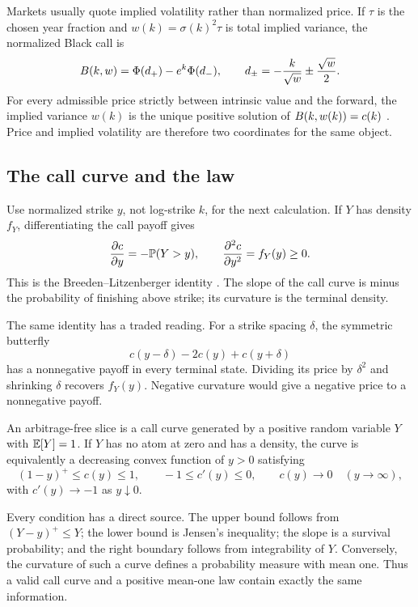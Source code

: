 Markets usually quote implied volatility rather than normalized price.  If
$\tau$ is the chosen year fraction and $w(k)=\sigma(k)^2\tau$ is total implied
variance, the normalized Black call is
\begin{equation}
B(k,w)=\Phi(d_+)-e^k\Phi(d_-),
\qquad d_\pm=-\frac{k}{\sqrt w}\pm\frac{\sqrt w}{2}.
\label{eq:black}
\end{equation}
For every admissible price strictly between intrinsic value and the forward,
the implied variance $w(k)$ is the unique positive solution of
$B(k,w(k))=c(k)$ \citep{Black1976}.  Price and implied volatility are
therefore two coordinates for the same object.

\subsection{The call curve and the law}

Use normalized strike $y$, not log-strike $k$, for the next calculation.  If
$Y$ has density $f_Y$, differentiating the call payoff gives
\begin{equation}
\frac{\partial c}{\partial y}=-\mathbb{P}(Y>y),\qquad
\frac{\partial^2c}{\partial y^2}=f_Y(y)\ge0.
\label{eq:BL}
\end{equation}
This is the Breeden--Litzenberger identity
\citep{BreedenLitzenberger1978}.  The slope of the call curve is minus the
probability of finishing above strike; its curvature is the terminal density.

The same identity has a traded reading.  For a strike spacing $\delta$, the
symmetric butterfly
\[
c(y-\delta)-2c(y)+c(y+\delta)
\]
has a nonnegative payoff in every terminal state.  Dividing its price by
$\delta^2$ and shrinking $\delta$ recovers $f_Y(y)$.  Negative curvature
would give a negative price to a nonnegative payoff.

\begin{definition}
\label{def:slice}
An arbitrage-free slice is a call curve generated by a positive random
variable $Y$ with $\mathbb{E}[Y]=1$.  If $Y$ has no atom at zero and has a density,
the curve is equivalently a decreasing convex function of $y>0$ satisfying
\[
(1-y)^+\le c(y)\le1,\qquad -1\le c'(y)\le0,
\qquad c(y)\longrightarrow0\quad(y\to\infty),
\]
with $c'(y)\to-1$ as $y\downarrow0$.
\end{definition}

Every condition has a direct source.  The upper bound follows from
$(Y-y)^+\le Y$; the lower bound is Jensen's inequality; the slope is a
survival probability; and the right boundary follows from integrability of
$Y$.  Conversely, the curvature of such a curve defines a probability
measure with mean one.  Thus a valid call curve and a positive mean-one law
contain exactly the same information.

